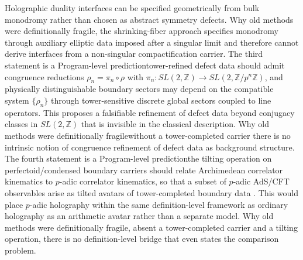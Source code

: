 \documentclass[11pt]{article}
\theoremstyle{remark}
\newcommand{\Z}{\mathbb{Z}}
\begin{document}
Holographic duality interfaces can be specified geometrically from bulk monodromy rather than chosen as abstract symmetry defects. Why old methods were definitionally fragile, the shrinking-fiber approach specifies monodromy through auxiliary elliptic data imposed after a singular limit and therefore cannot derive interfaces from a non-singular compactification carrier. The third statement is a Program-level prediction\:tower-refined defect data should admit congruence reductions \(\rho_{n}=\pi_{n}\circ \rho\) with \(\pi_n:SL(2,\Z)\to SL(2,\Z/p^{n}\Z)\), and physically distinguishable boundary sectors may depend on the compatible system \(\{\rho_n\}\) through tower-sensitive discrete global sectors coupled to line operators. This proposes a falsifiable refinement of defect data beyond conjugacy classes in \(SL(2,\Z)\) that is invisible in the classical description. Why old methods were definitionally fragile\:without a tower-completed carrier there is no intrinsic notion of congruence refinement of defect data as background structure. The fourth statement is a Program-level prediction\:the tilting operation on perfectoid/condensed boundary carriers should relate Archimedean correlator kinematics to \(p\)-adic correlator kinematics, so that a subset of \(p\)-adic AdS/CFT observables arise as tilted avatars of tower-completed boundary data \cite{Gubser2017, Heydeman2018}. This would place \(p\)-adic holography within the same definition-level framework as ordinary holography as an arithmetic avatar rather than a separate model. Why old methods were definitionally fragile, absent a tower-completed carrier and a tilting operation, there is no definition-level bridge that even states the comparison problem.
\end{document}
